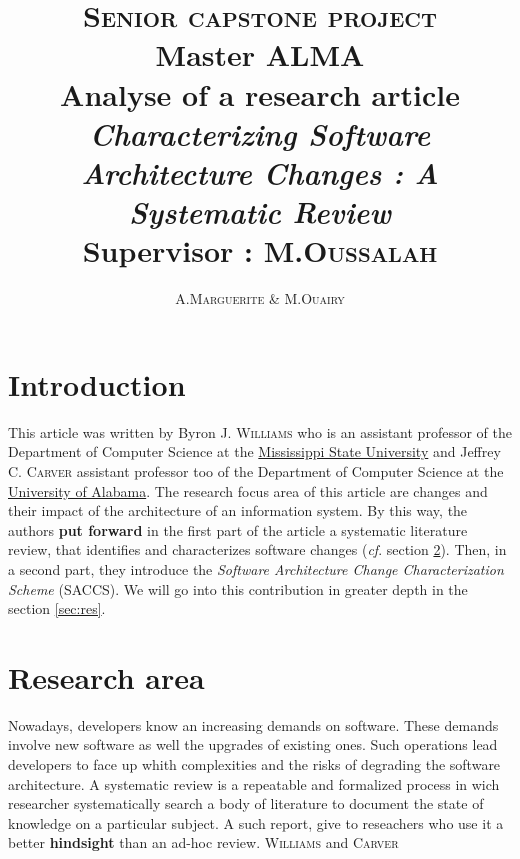 \documentclass[12pt]{article}
\title{ {\huge \textsc{Senior capstone project}} \\  Master ALMA  \\ \textbf{Analyse of a research article} \\ \emph{Characterizing Software Architecture Changes : A Systematic Review}\\{\small Supervisor :  M.\textsc{Oussalah}}}
\author{A.\textsc{Marguerite} \& M.\textsc{Ouairy}}
\newcommand{\cf}{\emph{cf}.}
\begin{document}
\maketitle
\renewcommand{\labelitemi}{$\bullet$} 



\section{Introduction}\label{sec:intro}
This article was written by Byron J. \textsc{Williams} who is an assistant professor of the Department of Computer Science at the \href{http://www.msstate.edu/}{Mississippi State University} and Jeffrey C. \textsc{Carver} assistant professor too of the Department of Computer Science at the \href{http://www.ua.edu/}{University of Alabama}. The research focus area of this article are changes and their impact of the architecture of an information system. By this way, the authors \textbf{put forward} in the first part of the article a systematic literature review, that identifies and characterizes software changes (\cf{} section \ref{sec:pblm}). Then, in a second part, they introduce the \emph{Software Architecture Change Characterization Scheme} (SACCS). We will go into this contribution in greater depth in the section \ref{sec:res}. 



\section{Research area}\label{sec:pblm}
Nowadays, developers know an increasing demands on software. These demands involve new software as well the upgrades of existing ones. Such operations lead developers to face up whith complexities and the risks of degrading the software architecture. A systematic review is a repeatable and formalized process in wich researcher systematically search a body of literature to document the state of knowledge on a particular subject. A such report, give to reseachers who use it a better \textbf{hindsight} than an ad-hoc review. \textsc{Williams} and \textsc{Carver} 
\end{document}
